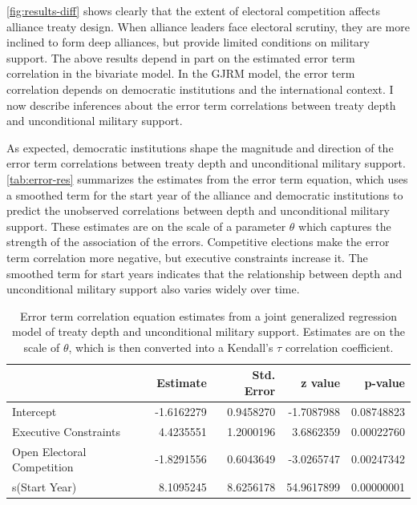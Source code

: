 \documentclass[12pt]{article}
\begin{document}
\autoref{fig:results-diff} shows clearly that the extent of electoral competition affects alliance treaty design.
When alliance leaders face electoral scrutiny, they are more inclined to form deep alliances, but provide limited conditions on military support. 
The above results depend in part on the estimated error term correlation in the bivariate model. 
In the GJRM model, the error term correlation depends on democratic institutions and the international context. 
I now describe inferences about the error term correlations between treaty depth and unconditional military support. 


As expected, democratic institutions shape the magnitude and direction of the error term correlations between treaty depth and unconditional military support. 
\autoref{tab:error-res} summarizes the estimates from the error term equation, which uses a smoothed term for the start year of the alliance and democratic institutions to predict the unobserved correlations between depth and unconditional military support. 
These estimates are on the scale of a parameter $\theta$ which captures the strength of the association of the errors. 
Competitive elections make the error term correlation more negative, but executive constraints increase it. 
The smoothed term for start years indicates that the relationship between depth and unconditional military support also varies widely over time. 


\begin{table}[ht]
\centering
\begin{tabular}{lrrrr}
  \hline
 & Estimate & Std. Error & z value & p-value \\ 
  \hline
Intercept & -1.6162279 & 0.9458270 & -1.7087988 & 0.08748823 \\ 
  Executive Constraints & 4.4235551 & 1.2000196 & 3.6862359 & 0.00022760 \\ 
  Open Electoral Competition & -1.8291556 & 0.6043649 & -3.0265747 & 0.00247342 \\ 
  s(Start Year) & 8.1095245 & 8.6256178 & 54.9617899 & 0.00000001 \\ 
   \hline
\end{tabular}
\caption{Error term correlation equation estimates from a joint generalized regression model of treaty depth and unconditional military support. 
                    Estimates are on the scale of $\theta$, which is then converted into a Kendall's $\tau$ correlation coefficient. 
                    } 
\label{tab:error-res}
\end{table}
\end{document}
